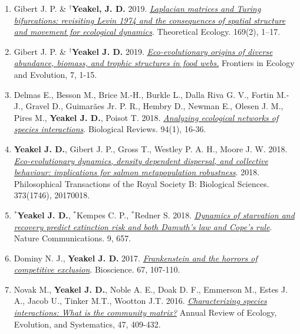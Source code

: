 \documentclass[margin,line,12pt]{res}
\begin{document}
\begin{resume}
\begin{enumerate}
\item Gibert J. P. \& \textbf{${}^\dag$Yeakel, J. D.} 2019. \href{https://link.springer.com/article/10.1007/s12080-018-0403-2}{\emph{Laplacian matrices and Turing bifurcations: revisiting Levin 1974 and the consequences of spatial structure and movement for ecological dynamics}}. Theoretical Ecology. 169(2), 1–17.

\item Gibert J. P. \& \textbf{${}^\dag$Yeakel J. D.} 2019. \href{https://www.frontiersin.org/articles/10.3389/fevo.2019.00015/full}{\emph{Eco-evolutionary origins of diverse abundance, biomass, and trophic structures in food webs.}} Frontiers in Ecology and Evolution, 7, 1-15.
  
\item Delmas E., Besson M., Brice M.-H., Burkle L., Dalla Riva G. V., Fortin M.-J., Gravel D., Guimar\~aes Jr. P. R., Hembry D., Newman E., Olesen J. M., Pires M., \textbf{Yeakel J. D.}, Poisot T. 2018. \href{https://onlinelibrary.wiley.com/doi/abs/10.1111/brv.12433}{\emph{Analyzing ecological networks of species interactions}}. Biological Reviews. 94(1), 16-36.

\item \textbf{Yeakel J. D.}, Gibert J. P., Gross T., Westley P. A. H., Moore J. W. 2018. \href{https://royalsocietypublishing.org/doi/10.1098/rstb.2017.0018}{\emph{Eco-evolutionary dynamics, density dependent dispersal, and collective behaviour: implications for salmon metapopulation robustness}}. 2018. Philosophical Transactions of the Royal Society B: Biological Sciences. 373(1746), 20170018.

\item \textbf{${}^\ast$Yeakel J. D.}, ${}^\ast$Kempes C. P., ${}^\ast$Redner S. 2018. \href{https://www.nature.com/articles/s41467-018-02822-y}{\emph{Dynamics of starvation and recovery predict extinction risk and both Damuth's law and Cope's rule}}. Nature Communications. 9, 657.

\item Dominy N. J., \textbf{Yeakel J. D.} 2017. \href{https://academic.oup.com/bioscience/article-pdf/67/2/107/10251235/biw133.pdf}{\emph{Frankenstein and the horrors of competitive exclusion}}. Bioscience. 67, 107-110.

\item Novak M., \textbf{Yeakel J. D.}, Noble A. E., Doak D. F., Emmerson M., Estes J. A., Jacob U., Tinker M.T., Wootton J.T. 2016. \href{https://pubs.er.usgs.gov/publication/70173930}{\emph{Characterizing species interactions: What is the community matrix?}} Annual Review of Ecology, Evolution, and Systematics, 47, 409-432.


\end{enumerate}
\end{resume}
\end{document}
